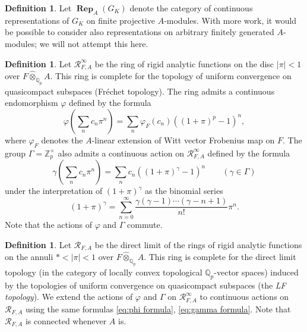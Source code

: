 \documentclass[12pt]{amsart}
\theoremstyle{definition}
\newtheorem{defn}[theorem]{Definition}
\numberwithin{equation}{theorem}
\newcommand{\QQ}{\mathbb{Q}}
\newcommand{\ZZ}{\mathbb{Z}}
\newcommand{\calR}{\mathcal{R}}
\DeclareMathOperator{\Rep}{\mathbf{Rep}}
\begin{document}
\begin{defn}
Let $\Rep_A(G_K)$ denote the category of continuous representations of $G_K$ on finite projective $A$-modules. With more work, it would be possible to consider also representations on arbitrary finitely generated $A$-modules; we will not attempt this here.
\end{defn}

\begin{defn}
Let $\calR^\infty_{F,A}$ be the ring of rigid analytic functions on the disc $\left| \pi \right| < 1$ over $F \widehat{\otimes}_{\QQ_p} A$. This ring is complete for the topology of uniform convergence on quasicompact subspaces (Fr\'echet topology). The ring admits a continuous endomorphism $\varphi$ defined by the formula
\begin{equation} \label{eq:phi formula}
\varphi \left( \sum_n c_n \pi^n \right) =  \sum_n \varphi_F(c_n) ((1 + \pi)^p-1)^n,
\end{equation}
where $\varphi_F$ denotes the $A$-linear extension of Witt vector Frobenius map on $F$.
The group $\Gamma = \ZZ_p^\times$ also admits a continuous action on $\calR^\infty_{F,A}$ defined by the formula
\begin{equation} \label{eq:gamma formula}
\gamma \left( \sum_n c_n \pi^n \right) = \sum_n c_n ((1 + \pi)^\gamma-1)^n \qquad (\gamma \in \Gamma)
\end{equation}
under the interpretation of $(1 + \pi)^\gamma$ as the binomial series 
\[
(1 + \pi)^\gamma = \sum_{n=0}^\infty \frac{\gamma(\gamma-1)\cdots (\gamma-n+1)}{n!} \pi^n.
\]
Note that the actions of $\varphi$ and $\Gamma$ commute.
\end{defn}

\begin{defn}
Let $\calR_{F,A}$ be the direct limit of the rings of rigid analytic functions on the annuli $* < \left| \pi \right| < 1$ over $F \widehat{\otimes}_{\QQ_p} A$. This ring is complete for the direct limit topology (in the category of locally convex topological $\QQ_p$-vector spaces) induced by the topologies of uniform convergence on quasicompact subspaces (the \emph{LF topology}). We extend the actions of $\varphi$ and $\Gamma$ on $\calR^\infty_{F,A}$ to continuous actions on $\calR_{F,A}$ using the same formulas \eqref{eq:phi formula}, \eqref{eq:gamma formula}.
Note that $\calR_{F,A}$ is connected whenever $A$ is.
\end{defn}
\end{document}
